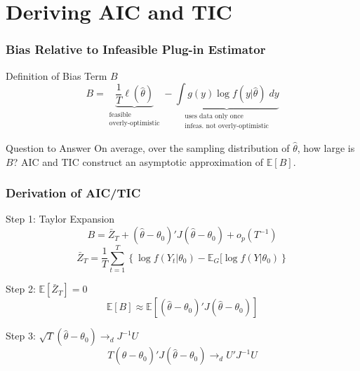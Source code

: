 \section{Deriving AIC and TIC}
\begin{frame}
  \frametitle{Bias Relative to Infeasible Plug-in Estimator}


  \begin{block}{Definition of Bias Term $B$}
  \[
    B = \underbrace{\frac{1}{T} \ell(\widehat{\theta})}_{\substack{ \text{feasible}\\ \text{overly-optimistic}}} - \underbrace{\int g(y) \log f(y|\widehat{\theta})\; dy}_{\substack{\text{uses data only once} \\ \text{infeas.\ not overly-optimistic}}}
  \]
\end{block}

\pause

\begin{alertblock}{Question to Answer}
  On average, over the sampling distribution of $\widehat{\theta}$, how large is $B$? AIC and TIC construct an asymptotic approximation of $\mathbb{E}[B]$.
\end{alertblock}

\end{frame}
\begin{frame}
  \frametitle{Derivation of AIC/TIC}
  \begin{block}{Step 1: Taylor Expansion}
    \vspace{-1em}
    \[B = \bar{Z}_T +  (\widehat{\theta} - \theta_0)' J  (\widehat{\theta} - \theta_0) + o_p(T^{-1})\]
    \footnotesize
    \[\bar{Z}_T = \frac{1}{T} \sum_{t=1}^T \left\{ \log f(Y_t|\theta_0) - \mathbb{E}_G[\log f(Y|\theta_0) \right\}\]
  \end{block}

  \vspace{-1em}

  \pause

  \begin{block}{Step 2: $\mathbb{E}[\bar{Z}_T] = 0$}
    \vspace{-1.5em}
    \[\mathbb{E}[B] \approx \mathbb{E}\left[ (\widehat{\theta} - \theta_0)'J(\widehat{\theta} - \theta_0) \right]\]
  \end{block}

  \pause

  \vspace{-1em}

  \begin{block}{Step 3: $\sqrt{T}(\widehat{\theta} - \theta_0) \rightarrow_d J^{-1}U$}
    \vspace{-1.5em}
    \[
      T(\widehat{\theta} - \theta_0)'J(\widehat{\theta} - \theta_0) \rightarrow_d U'J^{-1}U
    \]
  \end{block}

\end{frame}
